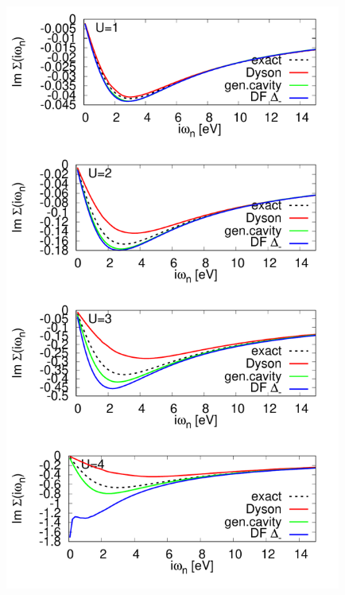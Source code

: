 \documentclass[12pt,a4paper]{scrartcl}
\numberwithin{equation}{section}
\begin{document}
\includegraphics[width=0.83\textwidth]{figs/bathNonlocFromDMFTderiv/DF/DF_sigma_compare.pdf}

\clearpage


\end{document}
